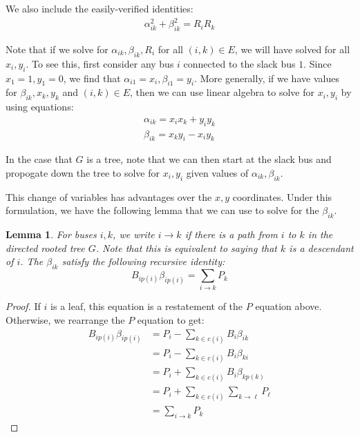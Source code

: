 \documentclass[10pt, a4paper, twoside]{article}
\theoremstyle{plain}
\numberwithin{equation}{section}
\newtheorem{lemma}{Lemma}[section]
\theoremstyle{definition}
\theoremstyle{remark}
\begin{document}
We also include the easily-verified identities:
\begin{align*}
\alpha_{ik}^2+\beta_{ik}^2 = R_iR_k
\end{align*}

Note that if we solve for $\alpha_{ik}, \beta_{ik}, R_i$ for all $(i,k) \in E$, we will have solved for all $x_i, y_i$. To see this, first consider any bus $i$ connected to the slack bus $1$. Since $x_1 = 1, y_1 = 0$, we find that $\alpha_{i1} = x_i, \beta_{i1} = y_i$. More generally, if we have values for $\beta_{ik}, x_k, y_k$ and $(i,k) \in E$, then we can use linear algebra to solve for $x_i, y_i$ by using equations:
\begin{align*}
\alpha_{ik} = x_ix_k+y_iy_k\\
\beta_{ik} = x_ky_i-x_iy_k\end{align*}

In the case that $G$ is a tree, note that we can then start at the slack bus and propogate down the tree to solve for $x_i, y_i$ given values of $\alpha_{ik}, \beta_{ik}$.

This change of variables has advantages over the $x,y$ coordinates. Under this formulation, we have the following lemma that we can use to solve for the $\beta_{ik}$.

\begin{lemma}\label{beta_vals}
For buses $i,k$, we write $i \to k$ if there is a path from $i$ to $k$ in the directed rooted tree $G$. Note that this is equivalent to saying that $k$ is a descendant of $i$. The $\beta_{ik}$ satisfy the following recursive identity:
\begin{equation}
B_{ip(i)}\beta_{ip(i)} = \sum_{i \to k} P_k
\end{equation}\end{lemma}
\begin{proof}
If $i$ is a leaf, this equation is a restatement of the $P$ equation above. Otherwise, we rearrange the $P$ equation to get:
\begin{align*}
B_{ip(i)}\beta_{ip(i)} &= P_i - \sum_{k \in c(i)}B_i\beta_{ik}\\
&= P_i - \sum_{k\in c(i)}B_i\beta_{ki}\\
&= P_i + \sum_{k\in c(i)}B_i\beta_{kp(k)}\\
&= P_i + \sum_{k\in c(i)}\sum_{k\to \ell} P_\ell\\
&= \sum_{i \to k} P_k
\end{align*}
\end{proof}
\end{document}
